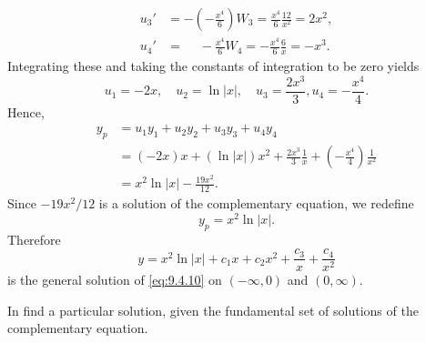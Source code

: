 \begin{solution}
\begin{align*}
u_3'
&=-\left(-\frac{x^4}{6}\right)W_3=\frac{x^4}{6}\frac{12}{x^2}=2x^2,\\
u_4'&=\phantom{-}-\frac{x^4}{6}W_4=-\frac{x^4}{6}\frac{6}{x}=-x^3.
\end{align*}
 Integrating these and taking the constants of
integration to be zero yields
\[
u_1=-2x,\quad u_2=\ln|x|,\quad u_3=\frac{2x^3}{3},
u_4=-\frac{x^4}{4}.
\]
Hence,
\begin{align*}
y_p
&=u_1y_1+u_2y_2+u_3y_3+u_4y_4\\
&=(-2x)x+(\ln|x|)x^2+\frac{2x^3}{3}\frac{1}{x}+\left(-\frac{x^4}{4}\right)
\frac{1}{x^2} \\
&=x^2\ln|x|-\frac{19x^2}{12}.
\end{align*}
Since $-19x^2/12$ is a solution of the complementary equation, we redefine
\[
y_p=x^2\ln|x|.
\]
 Therefore
\[
y=x^2\ln|x|+c_1x+c_2x^2+\frac{c_3}{x}+\frac{c_4}{x^2}
\]
is the general solution of \eqref{eq:9.4.10} on $(-\infty,0)$ and $(0,\infty)$.
\end{solution}

\exercises
In  find a particular
solution,
given the fundamental set of solutions of the complementary equation.

